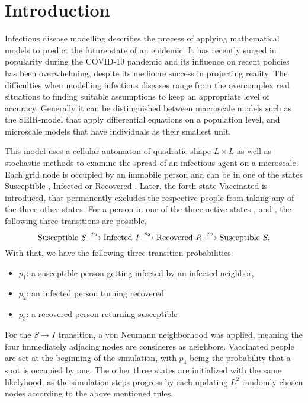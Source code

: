 \section{Introduction}

Infectious disease modelling describes the process of applying mathematical models to predict the future state of an epidemic. 
It has recently surged in popularity during the COVID-19 pandemic and its influence on recent policies has been overwhelming, despite its mediocre success in projecting reality. 
The difficulties when modelling infectious diseases range from the overcomplex real situations to finding suitable assumptions to keep an appropriate level of accuracy.
Generally it can be distinguished between macroscale models such as the SEIR-model\cite{SEIR_Heidelberg} that apply differential equations on a population level, 
and microscale models that have individuals as their smallest unit.

This model uses a cellular automaton\cite{CellularAutomaton} of quadratic shape $L\times L$ as well as stochastic methods to examine the spread of an infectious agent on a microscale. 
Each grid node is occupied by an immobile person and can be in one of the states Susceptible \susceptible{}, Infected \infected{} or Recovered \recovered{}. Later, the forth state Vaccinated \vaccinated{} is introduced, 
that permanently excludes the respective people from taking any of the three other states. 
For a person in one of the three active states \susceptible{}, \infected{} and \recovered{}, the following three transitions are possible,
\begin{equation*}
    \mathrm{Susceptible}~\susceptible\xlongrightarrow{p_1}\mathrm{Infected}~\infected{}\xlongrightarrow{p_2}\mathrm{Recovered}~\recovered{}\xlongrightarrow{p_3}\mathrm{Susceptible}~\susceptible{}.
\end{equation*}
With that, we have the following three transition probabilities:
\begin{itemize}
    \item $p_1$: a susceptible person getting infected by an infected neighbor,
    \item $p_2$: an infected person turning recovered
    \item $p_3$: a recovered person returning susceptible
\end{itemize}
For the $\textit{S}{}\rightarrow\textit{I}{}$ transition, a von Neumann neighborhood was applied, meaning the four immediately adjacing nodes are consideres as neighbors.\cite{CellularAutomaton} 
Vaccinated people \vaccinated{} are set at the beginning of the simulation, with $p_4$ being the probability that a spot is occupied by one. The other three states are initialized with the same likelyhood, as the 
simulation steps progress by each updating $L^2$ randomly chosen nodes according to the above mentioned rules.


